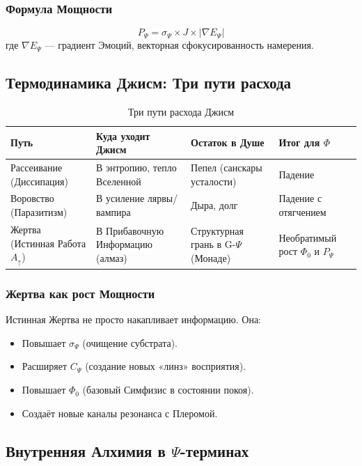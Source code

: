 \documentclass[a4paper,12pt]{article}
\begin{document}
\subsubsection{Формула Мощности}

\[
P_{\Psi} = \sigma_{\Psi} \times J \times |\nabla E_{\Psi}|
\]
где $\nabla E_{\Psi}$ — градиент Эмоций, векторная сфокусированность намерения.

\subsection{Термодинамика Джисм: Три пути расхода}

\begin{table}[H]
	\centering
	\begin{tabular}{|p{3.5cm}|p{4.5cm}|p{3.5cm}|p{3.5cm}|}
		\hline
		\textbf{Путь} & \textbf{Куда уходит Джисм} & \textbf{Остаток в Душе} & \textbf{Итог для $\Phi$} \\
		\hline
		Рассеивание (Диссипация) & В энтропию, тепло Вселенной & Пепел (санскары усталости) & Падение \\
		\hline
		Воровство (Паразитизм) & В усиление лярвы/вампира & Дыра, долг & Падение с отягчением \\
		\hline
		Жертва (Истинная Работа $A_{\uparrow}$) & В Прибавочную Информацию (алмаз) & Структурная грань в G-$\Psi$ (Монаде) & Необратимый рост $\Phi_0$ и $P_{\Psi}$ \\
		\hline
	\end{tabular}
	\caption{Три пути расхода Джисм}
\end{table}

\subsubsection{Жертва как рост Мощности}

Истинная Жертва не просто накапливает информацию. Она:
\begin{itemize}
	\item Повышает $\sigma_{\Psi}$ (очищение субстрата).
	\item Расширяет $C_{\Psi}$ (создание новых «линз» восприятия).
	\item Повышает $\Phi_0$ (базовый Симфизис в состоянии покоя).
	\item Создаёт новые каналы резонанса с Плеромой.
\end{itemize}

\subsection{Внутренняя Алхимия в $\Psi$-терминах}
\end{document}
